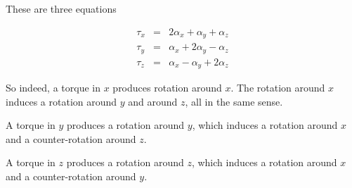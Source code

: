 These are three equations 

\begin{eqnarray}
\tau_x &=& 2\alpha_x + \alpha_y  + \alpha_z \\
\tau_y &=& \alpha_x + 2\alpha_y  - \alpha_z \\
\tau_z &=& \alpha_x - \alpha_y + 2\alpha_z
\end{eqnarray}


So indeed, a torque in $x$ produces rotation around $x$. The rotation around $x$ induces a rotation around $y$ and around $z$, all in the same sense. 


A torque in $y$ produces a rotation around $y$, which induces a rotation around $x$ and a counter-rotation around $z$.

A torque in $z$ produces a rotation around $z$, which induces a
rotation around $x$ and a counter-rotation around $y$.